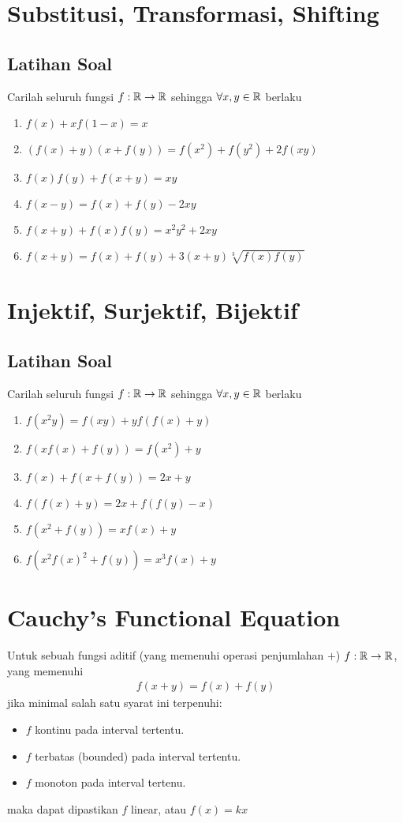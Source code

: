 \documentclass[11pt]{scrartcl}
\begin{document}
\section{Substitusi, Transformasi, Shifting}
\subsection{Latihan Soal}
Carilah seluruh fungsi $f:\mathbb R \to \mathbb R$ sehingga $\forall x,y \in \mathbb R$ berlaku
\begin{enumerate} 
    \item $f(x)+xf(1-x)=x$
    \item $(f(x)+y)(x+f(y))=f(x^2)+f(y^2)+2f(xy)$
    \item $f(x)f(y)+f(x+y)=xy$
    \item $f(x-y)=f(x)+f(y)-2xy$
    \item $f(x+y)+f(x)f(y)=x^2y^2+2xy$
    \item $f(x+y)=f(x)+f(y)+3(x+y)\sqrt[3]{f(x)f(y)}$
\end{enumerate}

\section{Injektif, Surjektif, Bijektif}
\subsection{Latihan Soal}
Carilah seluruh fungsi $f:\mathbb R \to \mathbb R$ sehingga $\forall x,y \in \mathbb R$ berlaku
\begin{enumerate} 
    \item $f(x^2y)=f(xy)+yf(f(x)+y)$
    \item $f(xf(x)+f(y))=f(x^2)+y$
    \item $f(x)+f(x+f(y))=2x+y$
    \item $f(f(x)+y)=2x+f(f(y)-x)$
    \item $f(x^2+f(y))=xf(x)+y$
    \item $f(x^2f(x)^2+f(y))=x^3f(x)+y$
\end{enumerate}

\section{Cauchy's Functional Equation}
Untuk sebuah fungsi aditif (yang memenuhi operasi penjumlahan $+$) $f:\mathbb R \to \mathbb R$, yang memenuhi
\begin{align*}
    f(x+y) = f(x)+f(y)
\end{align*}
jika minimal salah satu syarat ini terpenuhi:
\begin{itemize}
    \item $f$ kontinu pada interval tertentu.
    \item $f$ terbatas (bounded) pada interval tertentu.
    \item $f$ monoton pada interval tertenu.
\end{itemize}
maka dapat dipastikan $f$ linear, atau $f(x)=kx$
\end{document}
